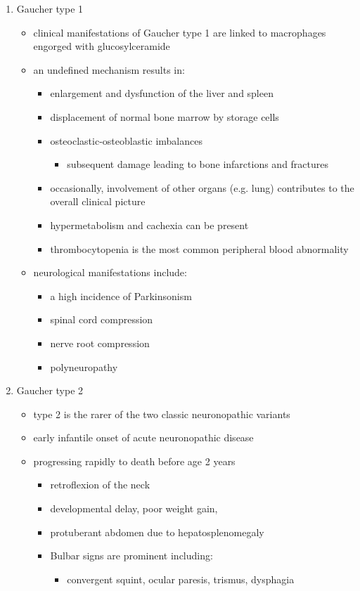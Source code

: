 \documentclass{scrartcl}
\begin{document}
\begin{enumerate}
\begin{enumerate}
\item Gaucher type 1
\label{sec:org5edf2f6}
\begin{itemize}
\item clinical manifestations of Gaucher type 1 are linked to macrophages
engorged with glucosylceramide

\item an undefined mechanism results in:
\begin{itemize}
\item enlargement and dysfunction of the liver and spleen
\item displacement of normal bone marrow by storage cells
\item osteoclastic-osteoblastic imbalances
\begin{itemize}
\item subsequent damage leading to bone infarctions and fractures
\end{itemize}
\item occasionally, involvement of other organs (e.g. lung) contributes
to the overall clinical picture
\item hypermetabolism and cachexia can be present
\item thrombocytopenia is the most common peripheral blood abnormality
\end{itemize}

\item neurological manifestations include:
\begin{itemize}
\item a high incidence of Parkinsonism
\item spinal cord compression
\item nerve root compression
\item polyneuropathy
\end{itemize}
\end{itemize}

\item Gaucher type 2
\label{sec:org660423d}
\begin{itemize}
\item type 2 is the rarer of the two classic neuronopathic variants
\item early infantile onset of acute neuronopathic disease
\item progressing rapidly to death before age 2 years

\begin{itemize}
\item retroflexion of the neck
\item developmental delay, poor weight gain,
\item protuberant abdomen due to hepatosplenomegaly
\item Bulbar signs are prominent including:
\begin{itemize}
\item convergent squint, ocular paresis, trismus, dysphagia
\end{itemize}
\end{itemize}


\end{itemize}
\end{enumerate}
\end{enumerate}
\end{document}
